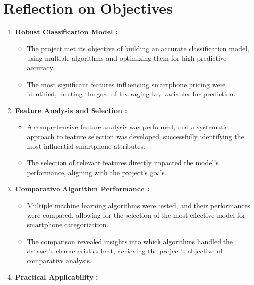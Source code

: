\documentclass[12pt]{report}
\begin{document}
\section{Reflection on Objectives}
\vspace{-0.5em}
\begin{enumerate}
	\setlength\itemsep{-1.05em}
	\item{\textbf{Robust Classification Model :}}
	      \vspace{-1.65em}
	      \begin{itemize}
		      \setlength\itemsep{-1.5em}
		      \item The project met its objective of building an accurate classification model, using multiple algorithms and optimizing them for high predictive accuracy.
		      \item The most significant features influencing smartphone pricing were identified, meeting the goal of leveraging key variables for prediction.
	      \end{itemize}
	\item{\textbf{Feature Analysis and Selection :}}
	      \vspace{-1.65em}
	      \begin{itemize}
		      \setlength\itemsep{-1.5em}
		      \item A comprehensive feature analysis was performed, and a systematic approach to feature selection was developed, successfully identifying the most influential smartphone attributes.
		      \item The selection of relevant features directly impacted the model’s performance, aligning with the project’s goals.
	      \end{itemize}
	\item{\textbf{Comparative Algorithm Performance :}}
	      \vspace{-1.65em}
	      \begin{itemize}
		      \setlength\itemsep{-1.5em}
		      \item Multiple machine learning algorithms were tested, and their performances were compared, allowing for the selection of the most effective model for smartphone categorization.
		      \item The comparison revealed insights into which algorithms handled the dataset’s characteristics best, achieving the project’s objective of comparative analysis.
	      \end{itemize}
	\item{\textbf{Practical Applicability :}}
	      \vspace{-1.65em}

\end{enumerate}
\end{document}
